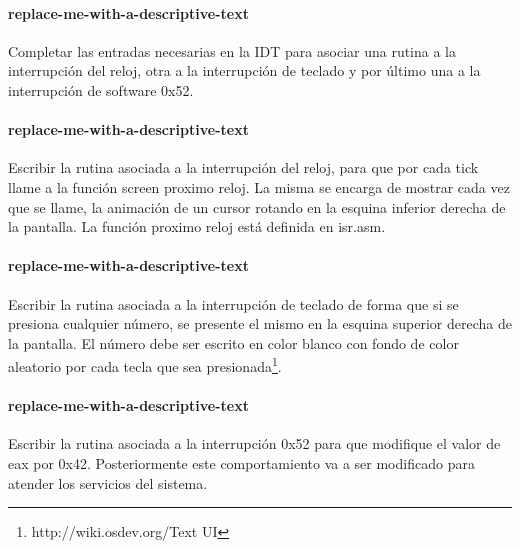 \paragraph{replace-me-with-a-descriptive-text}\label{subsubsec:ej5-a}
Completar las entradas necesarias en la IDT para asociar una rutina a la
interrupción del reloj, otra a la interrupción de teclado y por último una a la
interrupción de software 0x52.
\hruler
{}

\paragraph{replace-me-with-a-descriptive-text}\label{subsubsec:ej5-b}
Escribir la rutina asociada a la interrupción del reloj, para que por cada tick
llame a la función screen proximo reloj. La misma se encarga de mostrar cada vez
que se llame, la animación de un cursor rotando en la esquina inferior derecha
de la pantalla. La función proximo reloj está definida en isr.asm.
\hruler
{}

\paragraph{replace-me-with-a-descriptive-text}\label{subsubsec:ej5-c}
Escribir la rutina asociada a la interrupción de teclado de forma que si se
presiona cualquier número, se presente el mismo en la esquina superior derecha
de la pantalla. El número debe ser escrito en color blanco con fondo de color
aleatorio por cada tecla que sea presionada\footnote{http://wiki.osdev.org/Text
UI}.
\hruler
{}

\paragraph{replace-me-with-a-descriptive-text}\label{subsubsec:ej5-d}
Escribir la rutina asociada a la interrupción 0x52 para que modifique el valor
de eax por 0x42. Posteriormente este comportamiento va a ser modificado para
atender los servicios del sistema.
\hruler
{}
